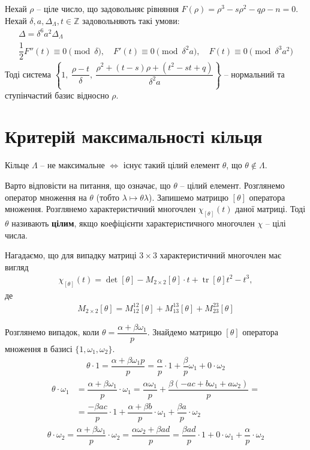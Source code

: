 \documentclass{thesis}
\DeclareMathOperator{\tr}{tr}
\begin{document}
\begin{theorem}
Нехай $\rho$ -- ціле число, що задовольняє рівняння $F(\rho) = \rho^3 - s \rho^2 - q \rho - n = 0$. Нехай $\delta,a,\Delta_{\Lambda},t \in \mathbb{Z}$ задовольняють такі умови:
\begin{align*}
\Delta = \delta^6 a^2 \Delta_\Lambda \\
\dfrac{1}{2} F''(t) \equiv 0 \pmod {\delta}, \quad F'(t) \equiv 0 \pmod {\delta^2 a}, \quad F(t) \equiv 0 \pmod{\delta^3 a^2}
\end{align*}
Тоді система $\left\{ 1,\ \dfrac{\rho - t}{\delta},\ \dfrac{\rho^2 + (t-s)\rho + (t^2 - st + q)}{\delta^2 a} \right\}$ -- нормальний та ступінчастий базис відносно $\rho$.
\end{theorem}

\section{Критерій максимальності кільця}
\begin{theorem}
Кільце $\Lambda$ -- не максимальне $\iff$ існує такий цілий елемент $\theta$, що $\theta \notin \Lambda$. 
\end{theorem}

Варто відповісти на питання, що означає, що $\theta$ -- цілий елемент. Розглянемо оператор множення на $\theta$ (тобто $\lambda \mapsto \theta \lambda$). Запишемо матрицю $[\theta]$ оператора множення. Розглянемо характеристичний многочлен $\chi_{[\theta]}(t)$ даної матриці. Тоді $\theta$ називають \textbf{цілим}, якщо коефіцієнти характеристичного многочлен $\chi$ -- цілі числа.

Нагадаємо, що для випадку матриці $3 \times 3$ характеристичний многочлен має вигляд
\begin{align*}
\chi_{[\theta]}(t) = \det [\theta] - M_{2 \times 2}[\theta] \cdot t + \tr [\theta] t^2 - t^3,
\end{align*}
де
\begin{align*}
M_{2 \times 2}[\theta] = M_{12}^{12}[\theta] + M_{13}^{13}[\theta] + M_{23}^{23}[\theta]
\end{align*}

Розглянемо випадок, коли $\theta = \dfrac{\alpha + \beta \omega_1}{p}$. Знайдемо матрицю $[\theta]$ оператора множення в базисі $\{1,\omega_1,\omega_2\}$.
\begin{align*}
\theta \cdot 1 = \dfrac{\alpha + \beta \omega_1 p}{p} = \dfrac{\alpha}{p} \cdot 1 + \dfrac{\beta}{p} \omega_1 + 0 \cdot \omega_2
\end{align*}
\begin{align*}
\theta \cdot \omega_1 & = \dfrac{\alpha + \beta \omega_1}{p} \cdot \omega_1 = \dfrac{\alpha \omega_1}{p} + \dfrac{\beta (-ac + b \omega_1 + a \omega_2)}{p} = \\
& = \dfrac{-\beta a c}{p} \cdot 1 + \dfrac{\alpha + \beta b}{p} \cdot \omega_1 + \dfrac{\beta a}{p} \cdot \omega_2
\end{align*}
\begin{align*}
\theta \cdot \omega_2 = \dfrac{\alpha + \beta \omega_1}{p} \cdot \omega_2 = \dfrac{\alpha \omega_2 + \beta ad}{p} = \dfrac{\beta a d}{p} \cdot 1 + 0 \cdot \omega_1 + \dfrac{\alpha}{p} \cdot \omega_2
\end{align*}
\end{document}
